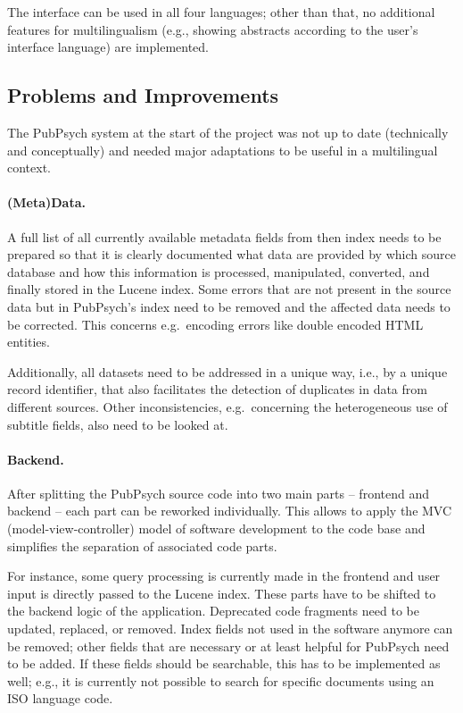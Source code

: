 \documentclass[a4paper,11pt]{article}
\begin{document}
The interface can be used in all four languages; other than that, no additional features for multilingualism (e.g., showing abstracts according to the user's interface language) are implemented.

\subsection{Problems and Improvements}
\label{ss:pubStruc_probs}

The PubPsych system at the start of the project was not up to date (technically and conceptually) and needed major adaptations to be useful in a multilingual context.

\paragraph{(Meta)Data.}
A full list of all currently available metadata fields from then index needs to be prepared so that it is clearly documented what data are provided by which source database and how this information is processed, manipulated, converted, and finally stored in the Lucene index. Some errors that are not present in the source data but in PubPsych's index need to be removed and the affected data needs to be corrected. This concerns e.g.\ encoding errors like double encoded HTML entities.

Additionally, all datasets need to be addressed in a unique way, i.e., by a unique record identifier, that also facilitates the detection of duplicates in data from different sources. Other inconsistencies, e.g.\ concerning the heterogeneous use of subtitle fields, also need to be looked at.

\paragraph{Backend.}
After splitting the PubPsych source code into two main parts -- frontend and backend -- each part can be reworked individually. This allows to apply the MVC (model-view-controller) model of software development to the code base and simplifies the separation of associated code parts.

For instance, some query processing is currently made in the frontend and user input is directly passed to the Lucene index. These parts have to be shifted to the backend logic of the application. Deprecated code fragments need to be updated, replaced, or removed. Index fields not used in the software anymore can be removed; other fields that are necessary or at least helpful for PubPsych need to be added. If these fields should be searchable, this has to be implemented as well; e.g., it is currently not possible to search for specific documents using an ISO language code. 
\end{document}
